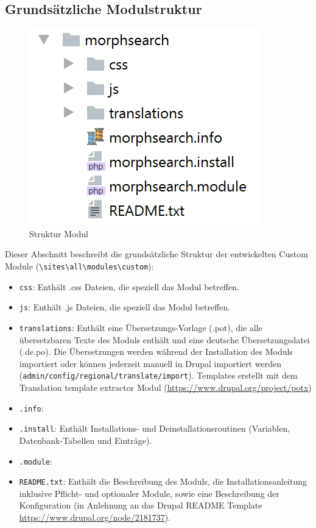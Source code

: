 \subsection{Grundsätzliche Modulstruktur}\label{sub:strukture_module}
\begin{figure}
	\centering
	\includegraphics[height=0.2\textheight]{images/structure_module}
	\caption[]{Struktur Modul}
	\label{fig:structuremodule}
\end{figure}

Dieser Abschnitt beschreibt die grundsätzliche Struktur der entwickelten Custom Module (\lstinline|\sites\all\modules\custom|):

\begin{itemize}
	\item \lstinline|css|: Enthält .css Dateien, die speziell das Modul betreffen.
	
	\item \lstinline|js|: Enthält .js Dateien, die speziell das Modul betreffen.
	
	\item \lstinline|translations|: Enthält eine Übersetzungs-Vorlage (.pot), die alle übersetzbaren Texte des Moduls enthält und eine deutsche Übersetzungsdatei (.de.po). Die Übersetzungen werden während der Installation des Moduls importiert oder können jederzeit manuell in Drupal importiert werden (\lstinline|admin/config/regional/translate/import|). Templates erstellt mit dem Translation template extractor Modul (\url{https://www.drupal.org/project/potx})
	
	\item \lstinline|.info|: 
	
	\item \lstinline|.install|: Enthält Installations- und Deinstallationsroutinen (Variablen, Datenbank-Tabellen und Einträge).
	
	\item \lstinline|.module|: 
	
	\item \lstinline|README.txt|: Enthält die Beschreibung des Moduls, die Installationsanleitung inklusive Pflicht- und optionaler Module, sowie eine Beschreibung der Konfiguration (in Anlehnung an das Drupal README Template \url{https://www.drupal.org/node/2181737}).
\end{itemize}




